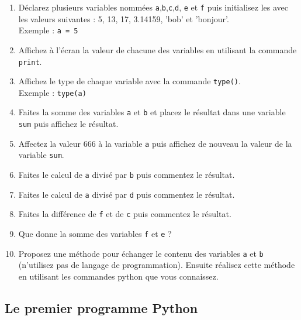 \begin{enumerate}

\item        Déclarez        plusieurs        variables        nommées
  \texttt{a},\texttt{b},\texttt{c},\texttt{d},      \texttt{e}      et
  \texttt{f} puis initialisez les avec  les valeurs suivantes : 5, 13,
  17, 3.14159, 'bob' et 'bonjour'.\\ Exemple : \texttt{a = 5}

  
\item  Affichez  à l'écran  la  valeur  de  chacune des  variables  en
  utilisant la commande \texttt{print}.

\item  Affichez   le  type  de   chaque  variable  avec   la  commande
  \texttt{type()}.\\ Exemple : \texttt{type(a)}

\item Faites la somme des variables \texttt{a} et \texttt{b} et placez
  le  résultat  dans  une   variable  \texttt{sum}  puis  affichez  le
  résultat.

\item Affectez la valeur 666 à la variable \texttt{a} puis affichez de
  nouveau la valeur de la variable \texttt{sum}.

\item  Faites  le calcul  de  \texttt{a}  divisé par  \texttt{b}  puis
  commentez le résultat.

\item  Faites  le calcul  de  \texttt{a}  divisé par  \texttt{d}  puis
  commentez le résultat.

\item  Faites  la  différence  de \texttt{f}  et  de  \texttt{c}  puis
  commentez le résultat.

\item Que donne la somme des variables \texttt{f} et \texttt{e} ?

\item  Proposez une  méthode pour  échanger le  contenu des  variables
  \texttt{a}   et   \texttt{b}   (n'utilisez   pas   de   langage   de
  programmation).   Ensuite réalisez  cette méthode  en utilisant  les
  commandes python que vous connaissez.

\end{enumerate}


\subsection{Le premier programme Python}

